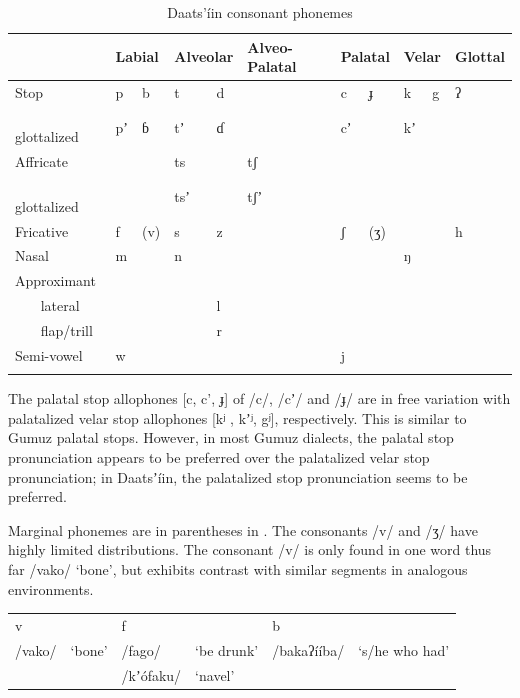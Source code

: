 \documentclass[output=paper]{langsci/langscibook}
\begin{document}
\begin{table}
\begin{tabularx}{\textwidth}{lXXXXXXXXXXXX} \lsptoprule & \multicolumn{2}{X}{Labial} & \multicolumn{2}{X}{Alveolar} & \multicolumn{2}{X}{Alveo-Palatal} & \multicolumn{2}{X}{Palatal} & \multicolumn{2}{X}{Velar} & \multicolumn{2}{X}{Glottal} \\
\midrule
Stop & p   &     b & t    &      d &  &  & c     &    ɟ & k    &    g & ʔ& \\
{\ \ \ } glottalized & pʼ    &   ɓ & tʼ     &    ɗ & &  & cʼ & & kʼ & & & \\
Affricate & & & ts & & tʃ & & &  &  & & & \\
{\ \ \ } glottalized & & & tsʼ & & tʃʼ & & & & & & & \\
Fricative & f    &    (v) & s     &     z &  & & ʃ    &     (ʒ) & &  & h & \\
Nasal & m & & n & & &  & &  & ŋ & & & \\
Approximant & & & & & & & & & & & & \\
{\ \ \ } lateral & &  & & l & &  & &  & &  & & \\
{\ \ \ } flap/trill & &  & & r & & & & & & & & \\
Semi-vowel & w & & &  &  & & j & & &  & & \\
\lspbottomrule
\end{tabularx}
\caption{Daats’íin consonant phonemes}
\label{tab:ahlandc:1}
\end{table}

The palatal stop allophones [c, c’, ɟ] of /c/, /cʼ/ and /ɟ/ are in free variation with palatalized velar stop allophones [kʲ , kʼʲ, gʲ], respectively. This is similar to Gumuz palatal stops. However, in most Gumuz dialects, the palatal stop pronunciation appears to be preferred over the palatalized velar stop pronunciation; in Daatsʼíin, the palatalized stop pronunciation seems to be preferred. 

Marginal phonemes are in parentheses in . The consonants /v/ and /ʒ/ have highly limited distributions. The consonant /v/ is only found in one word thus far /vako/ ‘bone’, but exhibits contrast with similar segments in analogous environments. 

\ea
\begin{tabular}{llllll}
v & & f & & b & \\
/vako/   &  ‘bone’  &   /fago/  &   ‘be drunk’  & /bakaʔííba/ & ‘s/he who had’  \\           
& & /kʼ\'{o}faku/ &  ‘navel’ & & \\
\end{tabular}
\z
\end{document}
